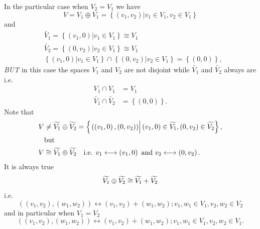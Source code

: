 \documentclass[aps,preprint]{revtex4}
\begin{document}
In the particular case when $V_{2}=V_{1}$ we have%
\begin{equation}
V=V_{1}\oplus V_{1}=\left\{ \left. \left( v_{1},v_{2}\right) \right\vert
v_{1}\in V_{1},v_{2}\in V_{1}\right\}
\end{equation}
and%
\begin{align}
& \widetilde{V_{1}}=\left\{ \left. \left( v_{1},0\right) \right\vert
v_{1}\in V_{1}\right\} \cong V_{1} \\
& \widetilde{V_{2}}=\left\{ \left. \left( 0,v_{2}\right) \right\vert
v_{2}\in V_{1}\right\} \cong V_{1} \\
& \left\{ \left. \left( v_{1},0\right) \right\vert v_{1}\in V_{1}\right\}
\cap\left\{ \left. \left( 0,v_{2}\right) \right\vert v_{2}\in V_{1}\right\}
=\left\{ \left( 0,0\right) \right\} ,
\end{align}
\emph{BUT }in this case the spaces $V_{1}$ and $V_{2}$ are not disjoint
while $\widetilde{V_{1}}$ and $\widetilde{V_{2}}$ always are i.e. \emph{\ }%
\begin{align}
V_{1}\cap V_{1} & =V_{1} \\
\widetilde{V_{1}}\cap\widetilde{V_{2}} & =\left\{ \left( 0,0\right) \right\}
.
\end{align}
Note that 
\begin{align}
V & \neq\widetilde{V_{1}}\oplus\widetilde{V_{2}}=\left\{ \left. \overset{}{%
\left( \left( v_{1},0\right) ,\left( 0,v_{2}\right) \right) }\right\vert
\left( v_{1},0\right) \in\widetilde{V_{1}},\left( 0,v_{2}\right) \in%
\widetilde{V_{2}}\right\} , \\
& \text{but} \\
V & \cong\widetilde{V_{1}}\oplus\widetilde{V_{2}}\quad\text{i.e. }%
v_{1}\longleftrightarrow\left( v_{1},0\right) \text{ and }%
v_{2}\longleftrightarrow\left( 0,v_{2}\right) .
\end{align}
It is always true 
\begin{equation}
\widetilde{V_{1}}\oplus\widetilde{V_{2}}\cong\widetilde{V_{1}}+\widetilde{%
V_{2}}
\end{equation}
i.e. 
\begin{equation}
\left( \left( v_{1},v_{2}\right) ,\left( w_{1},w_{2}\right) \right)
\longleftrightarrow\left( v_{1},v_{2}\right) +\left( w_{1},w_{2}\right)
;v_{1},w_{1}\in V_{1},v_{2},w_{2}\in V_{2}
\end{equation}
and in particular when $V_{1}=V_{2}$ 
\begin{equation}
\left( \left( v_{1},v_{2}\right) ,\left( w_{1},w_{2}\right) \right)
\longleftrightarrow\left( v_{1},v_{2}\right) +\left( w_{1},w_{2}\right)
;v_{1},w_{1}\in V_{1},v_{2},w_{2}\in V_{1}.
\end{equation}
\end{document}
